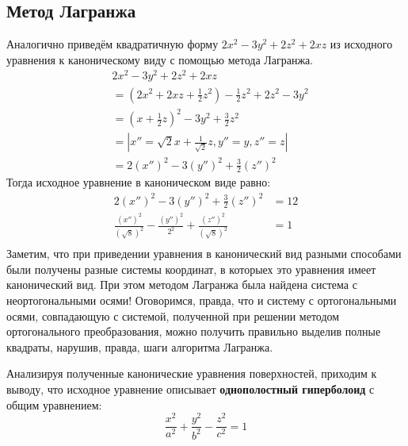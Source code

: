 \documentclass[12pt, a4paper]{article}
\begin{document}
\subsection{Метод Лагранжа}
Аналогично приведём квадратичную форму $2x^2-3y^2+2z^2+2xz$ из исходного уравнения к каноническому виду с помощью метода Лагранжа.
\begin{equation*}
\begin{aligned}
&2x^2-3y^2+2z^2+2xz\\
&=(2x^2+2xz+\frac{1}{2}z^2)-\frac{1}{2}z^2+2z^2-3y^2\\
&=(x+\frac{1}{2}z)^2-3y^2+\frac{3}{2}z^2\\
&=\left|x''=\sqrt{2}x+\frac{1}{\sqrt{2}}z, y''=y, z''=z\right|\\
&=2(x'')^2-3(y'')^2+\frac{3}{2}(z'')^2
\end{aligned}
\end{equation*}
Тогда исходное уравнение в каноническом виде равно:
\begin{equation*}
\begin{aligned}
2(x'')^2-3(y'')^2+\frac{3}{2}(z'')^2 &= 12\\
\frac{(x'')^2}{(\sqrt{8})^2}-\frac{(y'')^2}{2^2}+\frac{(z'')^2}{(\sqrt{8})^2} &= 1\\
\end{aligned}
\end{equation*}
Заметим, что при приведении уравнения в канонический вид разными способами были получены разные системы координат, в которыех это уравнения имеет канонический вид. При этом методом Лагранжа была найдена система с неортогональными осями! Оговоримся, правда, что и систему с ортогональными осями, совпадающую с системой, полученной при решении методом ортогонального преобразования, можно получить правильно выделив полные квадраты, нарушив, правда, шаги алгоритма Лагранжа.

Анализируя полученные канонические уравнения поверхностей, приходим к выводу, что исходное уравнение описывает \textbf{однополостный гиперболоид} с общим уравнением:
\begin{equation*}
\frac{x^2}{a^2}+\frac{y^2}{b^2}-\frac{z^2}{c^2}=1
\end{equation*}
\end{document}
